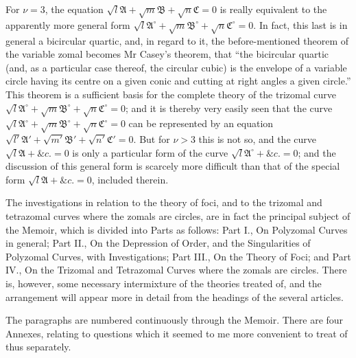 \documentclass[11pt,a4paper]{article}
\theoremstyle{definition}
\begin{document}
For $\nu=3$, the equation $\sqrt{l}\mathfrak{A}+\sqrt{m}\mathfrak{B}+\sqrt{n}\mathfrak{C}=0$ is really equivalent to the apparently more general form $\sqrt{l}\mathfrak{A}^\circ+\sqrt{m}\mathfrak{B}^\circ+\sqrt{n}\mathfrak{C}^\circ=0$. In fact, this last is in general a bicircular quartic, and, in regard to it, the before-mentioned theorem of the variable zomal becomes Mr Casey's theorem, that ``the bicircular quartic (and, as a particular case thereof, the circular cubic) is the envelope of a variable circle having its centre on a given conic and cutting at right angles a given circle.'' This theorem is a sufficient basis for the complete theory of the trizomal curve $\sqrt{l}\mathfrak{A}^\circ+\sqrt{m}\mathfrak{B}^\circ+\sqrt{n}\mathfrak{C}^\circ=0$; and it is thereby very easily seen that the curve $\sqrt{l}\mathfrak{A}^\circ+\sqrt{m}\mathfrak{B}^\circ+\sqrt{n}\mathfrak{C}^\circ=0$ can be represented by an equation $\sqrt{l'}\mathfrak{A}'+\sqrt{m'}\mathfrak{B}'+\sqrt{n'}\mathfrak{C}'=0$. But for $\nu>3$ this is not so, and the curve $\sqrt{l}\mathfrak{A}+\&c.=0$ is only a particular form of the curve $\sqrt{l}\mathfrak{A}^\circ+\&c.=0$; and the discussion of this general form is scarcely more difficult than that of the special form $\sqrt{l}\mathfrak{A}+\&c.=0$, included therein.

\setcounter{page}{471}

The investigations in relation to the theory of foci, and to the trizomal and tetrazomal curves where the zomals are circles, are in fact the principal subject of the Memoir, which is divided into Parts as follows: Part I., On Polyzomal Curves in general; Part II., On the Depression of Order, and the Singularities of Polyzomal Curves, with Investigations; Part III., On the Theory of Foci; and Part IV., On the Trizomal and Tetrazomal Curves where the zomals are circles. There is, however, some necessary intermixture of the theories treated of, and the arrangement will appear more in detail from the headings of the several articles.

The paragraphs are numbered continuously through the Memoir. There are four Annexes, relating to questions which it seemed to me more convenient to treat of thus separately.
\end{document}
